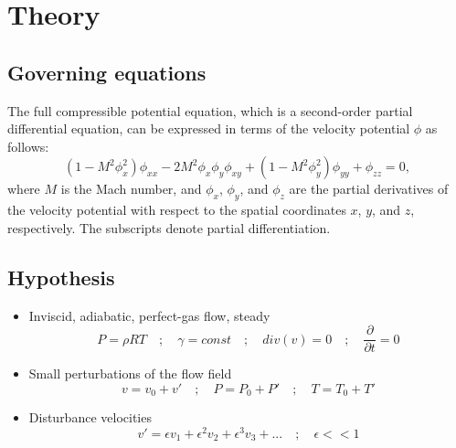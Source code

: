 \newpage

\section{Theory}
\label{sec:theory}


\subsection{Governing equations}
\label{subsec:governing_equations}
The full compressible potential equation, which is a second-order partial differential equation, can be expressed in terms of the velocity potential $\phi$ as follows:
\begin{equation}
	(1 - M^2\phi_x^2)\phi_{xx} - 2M^2\phi_x\phi_y\phi_{xy} + (1 - M^2\phi_y^2)\phi_{yy} + \phi_{zz} = 0,
\end{equation}
\label{eq:governing_equations}
where $M$ is the Mach number, and $\phi_x$, $\phi_y$, and $\phi_z$ are the partial derivatives of the velocity potential with respect to the spatial coordinates $x$, $y$, and $z$, respectively. The subscripts denote partial differentiation.

\subsection{Hypothesis}
\label{subsec:hypothesis}

\begin{itemize}
\item Inviscid, adiabatic, perfect-gas flow, steady
	\begin{equation*}
		P = \rho R T \quad ; \quad \gamma = const \quad ; \quad div(v) = 0 \quad ; \quad \frac{\partial }{\partial t} = 0
	\end{equation*}

\item Small perturbations of the flow field
	\begin{equation*}
		v = v_0 + v' \quad ; \quad P = P_0 + P' \quad ; \quad T = T_0 + T'
	\end{equation*}

\item Disturbance velocities
	\begin{equation*}
		v' = \epsilon v_1 + \epsilon^2 v_2 + \epsilon^3 v_3 + ... \quad ; \quad \epsilon << 1
	\end{equation*}

\end{itemize}

